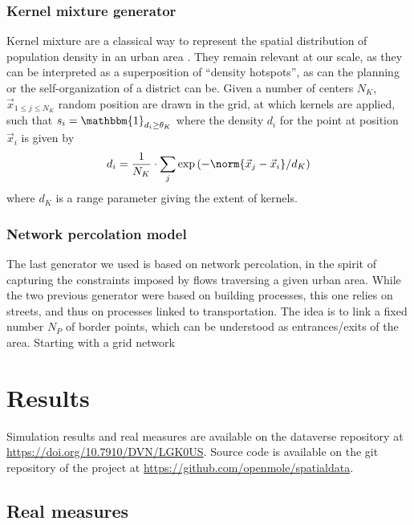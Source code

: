 \documentclass[letterpaper]{article}
\begin{document}
\subsubsection{Kernel mixture generator}

Kernel mixture are a classical way to represent the spatial distribution of population density in an urban area \citep{anas1998urban}. They remain relevant at our scale, as they can be interpreted as a superposition of ``density hotspots'', as can the planning or the self-organization of a district can be. Given a number of centers $N_K$, $\vec{x}_{1\leq j \leq N_K}$ random position are drawn in the grid, at which kernels are applied, such that $s_i = \mathbbm{1}_{d_i \geq \theta_K}$ where the density $d_i$ for the point at position $\vec{x}_i$ is given by
\begin{equation}
    d_i = \frac{1}{N_K}\cdot \sum_j \exp{\left(-\norm{\vec{x}_j - \vec{x}_i}/d_K\right)} 
\end{equation}
where $d_K$ is a range parameter giving the extent of kernels.

\subsubsection{Network percolation model}

The last generator we used is based on network percolation, in the spirit of capturing the constraints imposed by flows traversing a given urban area. While the two previous generator were based on building processes, this one relies on streets, and thus on processes linked to transportation. The idea is to link a fixed number $N_P$ of border points, which can be understood as entrances/exits of the area. Starting with a grid network 





\section{Results}

Simulation results and real measures are available on the dataverse repository at \url{https://doi.org/10.7910/DVN/LGK0US}. Source code is available on the git repository of the project at \url{https://github.com/openmole/spatialdata}.


\subsection{Real measures}
\end{document}
